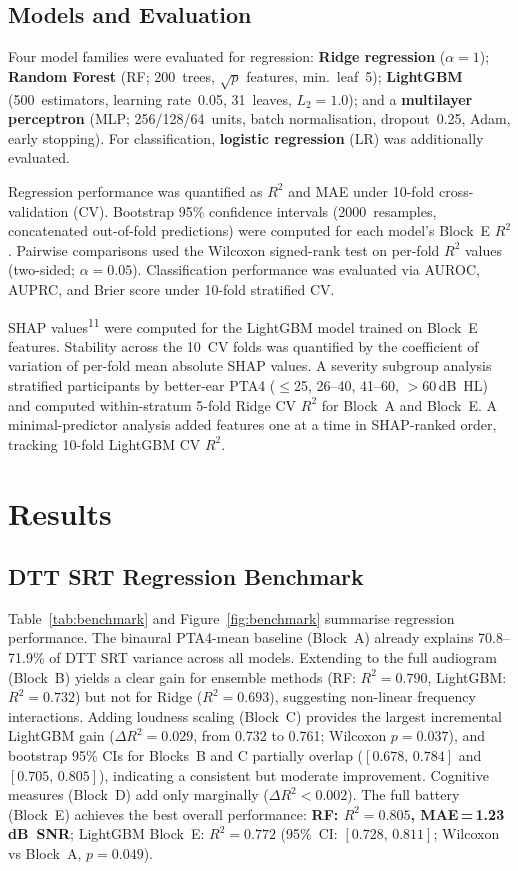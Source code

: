 \documentclass[12pt,a4paper]{article}
\begin{document}
\subsection{Models and Evaluation}

Four model families were evaluated for regression: \textbf{Ridge regression}
($\alpha{=}1$); \textbf{Random Forest} (RF; 200~trees, $\sqrt{p}$ features,
min.~leaf~5); \textbf{LightGBM} (500~estimators, learning rate~0.05,
31~leaves, $L_2{=}1.0$); and a \textbf{multilayer perceptron} (MLP;
256/128/64~units, batch normalisation, dropout~0.25, Adam, early
stopping).  For classification, \textbf{logistic regression} (LR) was
additionally evaluated.

Regression performance was quantified as $R^2$ and MAE under 10-fold
cross-validation (CV).  Bootstrap 95\% confidence intervals (2000~resamples,
concatenated out-of-fold predictions) were computed for each model's Block~E
$R^2$.  Pairwise comparisons used the Wilcoxon signed-rank test on per-fold
$R^2$ values (two-sided; $\alpha{=}0.05$).  Classification performance was
evaluated via AUROC, AUPRC, and Brier score under 10-fold stratified CV.

SHAP values\textsuperscript{11} were computed for the LightGBM model trained
on Block~E features.  Stability across the 10~CV folds was quantified by the
coefficient of variation of per-fold mean absolute SHAP values.  A
severity subgroup analysis stratified participants by better-ear PTA4
($\leq$25, 26--40, 41--60, $>$60\,dB~HL) and computed within-stratum 5-fold
Ridge CV $R^2$ for Block~A and Block~E.  A minimal-predictor analysis added
features one at a time in SHAP-ranked order, tracking 10-fold LightGBM CV
$R^2$.

\section{Results}

\subsection{DTT SRT Regression Benchmark}

Table~\ref{tab:benchmark} and Figure~\ref{fig:benchmark} summarise regression
performance.  The binaural PTA4-mean baseline (Block~A) already explains
70.8--71.9\% of DTT SRT variance across all models.  Extending to the full
audiogram (Block~B) yields a clear gain for ensemble methods (RF:
$R^2{=}0.790$, LightGBM: $R^2{=}0.732$) but not for Ridge ($R^2{=}0.693$),
suggesting non-linear frequency interactions.  Adding loudness scaling
(Block~C) provides the largest incremental LightGBM gain ($\Delta
R^2{=}0.029$, from 0.732 to 0.761; Wilcoxon $p{=}0.037$), and bootstrap 95\%
CIs for Blocks~B and C partially overlap ($[0.678,\,0.784]$ and
$[0.705,\,0.805]$), indicating a consistent but moderate improvement.
Cognitive measures (Block~D) add only marginally ($\Delta R^2{<}0.002$).  The
full battery (Block~E) achieves the best overall performance:
\textbf{RF: $R^2{=}0.805$, MAE\,=\,1.23\,dB~SNR}; LightGBM Block~E:
$R^2{=}0.772$ (95\%~CI: $[0.728,\,0.811]$; Wilcoxon vs Block~A, $p{=}0.049$).
\end{document}
